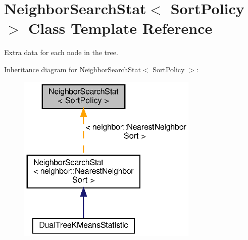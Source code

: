 \section{Neighbor\+Search\+Stat$<$ Sort\+Policy $>$ Class Template Reference}
\label{classmlpack_1_1neighbor_1_1NeighborSearchStat}


Extra data for each node in the tree.  




Inheritance diagram for Neighbor\+Search\+Stat$<$ Sort\+Policy $>$\+:
\nopagebreak
\begin{figure}[H]
\begin{center}
\leavevmode
\includegraphics[width=244pt]{classmlpack_1_1neighbor_1_1NeighborSearchStat__inherit__graph}
\end{center}
\end{figure}
